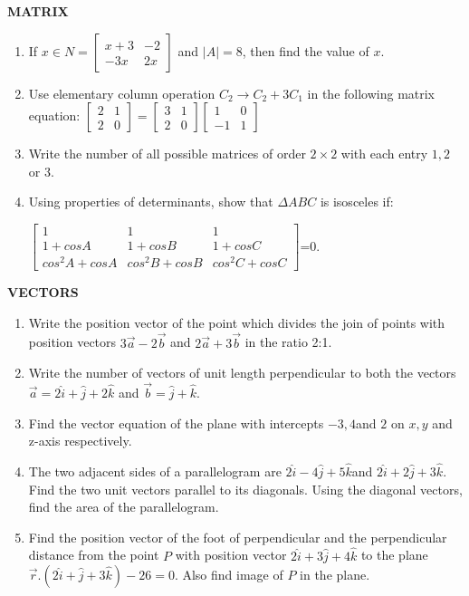 \documentclass[12pt,-letter paper]{article}
\providecommand{\myvec}[1]{\ensuremath{\begin{bmatrix}#1\end{bmatrix}}}
\begin{document}
\begin{center}                                                              \textbf{MATRIX}                                                     \end{center}  
\begin{enumerate}


\item If $x \in N=\myvec{x+3&-2\\ -3x&2x}$ and $|A|=8$, then find the value of $x$.
\item Use elementary column operation $C_2\rightarrow C_2+3C_1$ in the following matrix equation: 
	$\myvec{2&1\\2&0}=\myvec{3&1\\2&0}\myvec{1&0\\-1&1}$
\item Write the number of all possible matrices of order $2\times2$ with each entry $1, 2$ or $3$.
\item Using properties of determinants, show that $\Delta ABC$ is isosceles if: 
	


	\myvec{1&1&1\\ 1+cosA&1+cosB&1+cosC\\ cos^{2}A+cosA&cos^{2}B+cosB&cos^{2}C+cosC}=0.
		\end{enumerate}
		\begin{center}
			\textbf{VECTORS}
		\end{center}
\begin{enumerate}
\item Write the position vector of the point which divides the join of points with position vectors 
$3\overrightarrow{a}-2\overrightarrow{b}$ and $2\overrightarrow{a}+3\overrightarrow{b}$ in the ratio 2:1. 
\item Write the number of vectors of unit length perpendicular to both the vectors $\overrightarrow{a}=2\hat{i}+\hat{j}+2\hat{k}$ and $\overrightarrow{b}=\hat{j}+\hat{k}$. 
\item Find the vector equation of the plane with intercepts $-3, 4 $and $2$ on $x, y$ and z-axis respectively.
\item The two adjacent sides of a parallelogram are $2\hat{i} - 4\hat{j} + 5\hat{k} $and $2\hat{i} + 2\hat{j} + 3\hat{k}$. Find the two unit vectors parallel to its diagonals. Using the diagonal vectors, find the area of the parallelogram.
\item Find the position vector of the foot of perpendicular and the perpendicular distance from the point $P$ with position vector $2\hat{i}+3\hat{j}+4\hat{k}$ to the plane $\overrightarrow{r }.(2\hat{i}+\hat{j}+3\hat{k})-26=0$. Also find image of $P$ in the plane.
\end{enumerate}
\end{document}
